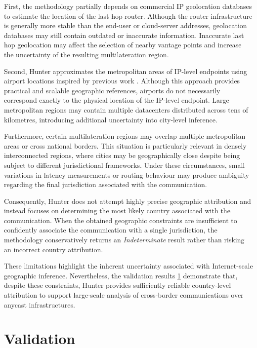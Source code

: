 First, the methodology partially depends on commercial IP geolocation databases to estimate the location of the last hop router. Although the router infrastructure is generally more stable than the end-user or cloud-server addresses, geolocation databases may still contain outdated or inaccurate information. Inaccurate last hop geolocation may affect the selection of nearby vantage points and increase the uncertainty of the resulting multilateration region.

Second, Hunter approximates the metropolitan areas of IP-level endpoints using airport locations inspired by previous work \cite{Cicalese2016Latency-BasedSets}. Although this approach provides practical and scalable geographic references, airports do not necessarily correspond exactly to the physical location of the IP-level endpoint. Large metropolitan regions may contain multiple datacenters distributed across tens of kilometres, introducing additional uncertainty into city-level inference.

Furthermore, certain multilateration regions may overlap multiple metropolitan areas or cross national borders. This situation is particularly relevant in densely interconnected regions, where cities may be geographically close despite being subject to different jurisdictional frameworks. Under these circumstances, small variations in latency measurements or routing behaviour may produce ambiguity regarding the final jurisdiction associated with the communication.

Consequently, Hunter does not attempt highly precise geographic attribution and instead focuses on determining the most likely country associated with the communication. When the obtained geographic constraints are insufficient to confidently associate the communication with a single jurisdiction, the methodology conservatively returns an \textit{Indeterminate} result rather than risking an incorrect country attribution.

These limitations highlight the inherent uncertainty associated with Internet-scale geographic inference. Nevertheless, the validation results \ref{sc:hunter_validation} demonstrate that, despite these constraints, Hunter provides sufficiently reliable country-level attribution to support large-scale analysis of cross-border communications over anycast infrastructures.

\section{Validation}
\label{sc:hunter_validation}

